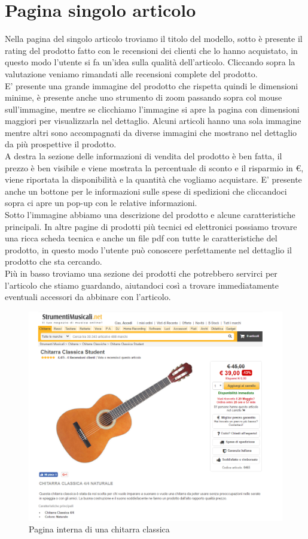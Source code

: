 \documentclass[12pt]{article}
\begin{document}
	\section{Pagina singolo articolo}
	Nella pagina del singolo articolo troviamo il titolo del modello, sotto è presente il rating del prodotto fatto con le recensioni dei clienti che lo hanno acquistato, in questo modo l'utente si fa un'idea sulla qualità dell'articolo. Cliccando sopra la valutazione veniamo rimandati alle recensioni complete del prodotto.
	\\ E' presente una grande immagine del prodotto che rispetta quindi le dimensioni minime, è presente anche uno strumento di zoom passando sopra col mouse sull'immagine, mentre se clicchiamo l'immagine si apre la pagina con dimensioni maggiori per visualizzarla nel dettaglio. Alcuni articoli hanno una sola immagine mentre altri sono accompagnati da diverse immagini che mostrano nel dettaglio da più prospettive il prodotto. \\
	 A destra la sezione delle informazioni di vendita del prodotto è ben fatta, il prezzo è ben visibile e viene mostrata la percentuale di sconto e il risparmio in \euro, viene riportata la disponibilità e la quantità che vogliamo acquistare. E' presente anche un bottone per le informazioni sulle spese di spedizioni che cliccandoci sopra ci apre un pop-up con le relative informazioni. \\
	 Sotto l'immagine abbiamo una descrizione del prodotto e alcune caratteristiche principali. In altre pagine di prodotti più tecnici ed elettronici possiamo trovare una ricca scheda tecnica e anche un file pdf con tutte le caratteristiche del prodotto, in questo modo l'utente può conoscere perfettamente nel dettaglio il prodotto che sta cercando. \\ Più in basso troviamo una sezione dei prodotti che potrebbero servirci per l'articolo che stiamo guardando, aiutandoci così a trovare immediatamente eventuali accessori da abbinare con l'articolo.
	 \begin{figure}[ht!]
	 	\centering	
	 	\includegraphics[width=170mm]{images/paginaProdotto.png}
	 	\caption{Pagina interna di una chitarra classica}
	 \end{figure}
	
\end{document}
